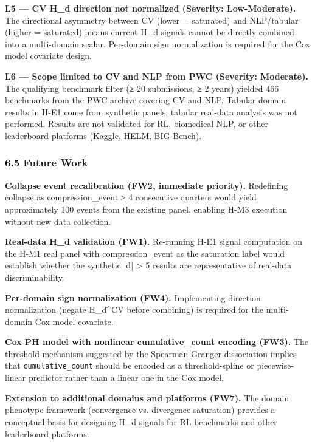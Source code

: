 \textbf{L5 — CV H_d direction not normalized (Severity: Low-Moderate).} The directional asymmetry between CV (lower = saturated) and NLP/tabular (higher = saturated) means current H_d signals cannot be directly combined into a multi-domain scalar. Per-domain sign normalization is required for the Cox model covariate design.

\textbf{L6 — Scope limited to CV and NLP from PWC (Severity: Moderate).} The qualifying benchmark filter (≥ 20 submissions, ≥ 2 years) yielded 466 benchmarks from the PWC archive covering CV and NLP. Tabular domain results in H-E1 come from synthetic panels; tabular real-data analysis was not performed. Results are not validated for RL, biomedical NLP, or other leaderboard platforms (Kaggle, HELM, BIG-Bench).

\subsubsection{6.5 Future Work}

\textbf{Collapse event recalibration (FW2, immediate priority).} Redefining collapse as compression_event ≥ 4 consecutive quarters would yield approximately 100 events from the existing panel, enabling H-M3 execution without new data collection.

\textbf{Real-data H_d validation (FW1).} Re-running H-E1 signal computation on the H-M1 real panel with compression_event as the saturation label would establish whether the synthetic |d| > 5 results are representative of real-data discriminability.

\textbf{Per-domain sign normalization (FW4).} Implementing direction normalization (negate H_d^CV before combining) is required for the multi-domain Cox model covariate.

\textbf{Cox PH model with nonlinear cumulative_count encoding (FW3).} The threshold mechanism suggested by the Spearman-Granger dissociation implies that \texttt{cumulative_count} should be encoded as a threshold-spline or piecewise-linear predictor rather than a linear one in the Cox model.

\textbf{Extension to additional domains and platforms (FW7).} The domain phenotype framework (convergence vs. divergence saturation) provides a conceptual basis for designing H_d signals for RL benchmarks and other leaderboard platforms.

